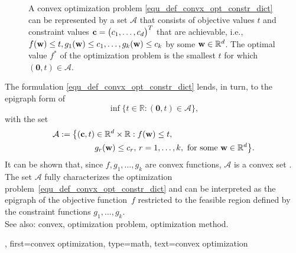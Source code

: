 {{{\begin{figure}
  \caption{A convex optimization problem \eqref{equ_def_convx_opt_constr_dict} can be represented 
  by a set $\mathcal{A}$ that consists of objective values $t$ and constraint values 
  ${\bf c}=\big(c_{1},\ldots,c_{d}\big)^{T}$ that are achievable, i.e., 
  $f({\bf w}) \leq t, g_{1}({\bf w})\leq c_{1},\ldots, g_{k}({\bf w}) \leq c_{k}$ 
  by some ${\bf w} \in \mathbb{R}^{d}$. The optimal value $f^{\ast}$ of the 
  optimization problem is the smallest $t$ for which $(\mathbf{0},t) \in \mathcal{A}$. }
\end{figure}
	The formulation \eqref{equ_def_convx_opt_constr_dict} lends, in turn, to the 
	epigraph form of \cite[Sec 5.3]{BoydConvexBook} 
	$$\inf \big\{ t \in \mathbb{R} : (\mathbf{0}, t) \in \mathcal{A} \big\},$$ 
	with the set 
	\begin{align} 
	\mathcal{A} := 
    \big\{ ({\bf c},t) & \in \mathbb{R}^{d} \times \mathbb{R} : 
    f({\bf w}) \leq t, \, \nonumber \\ 
   &  g_{r}({\bf w}) \leq c_{r}, \,
    r = 1,\ldots,k, 
    \text{ for some } {\bf w} \in \mathbb{R}^{d} \big\}. \nonumber
	\end{align}
	It can be shown that, since $f,g_{1},\ldots,g_{k}$ are convex functions, 
    $\mathcal{A}$ is a convex set \cite[Ch.2]{BoydConvexBook}.
	The set $\mathcal{A}$ fully characterizes the optimization problem~\eqref{equ_def_convx_opt_constr_dict} 
	and can be interpreted as the epigraph of the objective function~$f$ restricted to the 
	feasible region defined by the constraint functions $g_1,\ldots,g_k$.\\ 
    See also: convex, optimization problem, optimization method.
  },
	first={convex optimization},
	type=math,
  	text={convex optimization}
}

}

